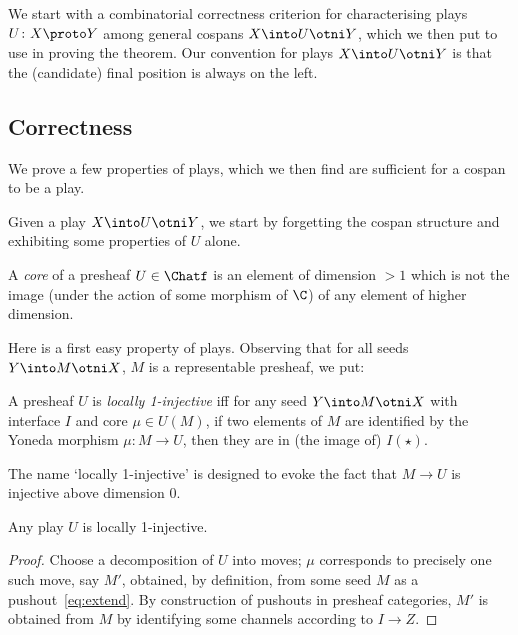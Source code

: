 \documentclass{LMCS}
\theoremstyle{plain}\newtheorem{satz}[thm]{Satz}
\begin{document}
We start with a combinatorial correctness criterion for characterising
plays $U \colon X \proto Y$ among general cospans $X \into U \otni Y$,
which we then put to use in proving the theorem. Our convention for
plays $X \into U \otni Y$ is that the (candidate) final position is
always on the left.

\subsection{Correctness}
We prove a few properties of plays, which we then find are sufficient
for a cospan to be a play.  

Given a play $X \into U \otni Y$, we start by forgetting the cospan
structure and exhibiting some properties of $U$ alone.

 \begin{defi}
   A \emph{core} of a presheaf $U \in \Chatf$ is an element of
   dimension $> 1$ which is not the image (under the action of some
   morphism of $\C$) of any element of higher dimension.
 \end{defi}

 Here is a first easy property of plays. Observing that for all seeds
 $Y \into M \otni X$, $M$ is a representable presheaf, we put:
\begin{defi}
  A presheaf $U$ is \emph{locally 1-injective} iff for any
  seed $Y \into M \otni X$ with interface $I$ and core $\mu \in U (M)$, if
  two elements of $M$ are identified by the Yoneda morphism $\mu
  \colon M \to U$, then they are in (the image of) $I (\star)$.
\end{defi}
The name `locally 1-injective' is designed to evoke the fact that $M
\to U$ is injective above dimension 0.
\begin{prop}
  Any play $U$ is locally 1-injective.
\end{prop}
\begin{proof}
  Choose a decomposition of $U$ into moves; $\mu$ corresponds
  to precisely one such move, say $M'$, obtained, by
  definition, from some seed $M$ as a
  pushout~\eqref{eq:extend}.  By construction of pushouts in presheaf
  categories, $M'$ is obtained from $M$ by identifying some channels
  according to $I \to Z$.
\end{proof}
\end{document}
